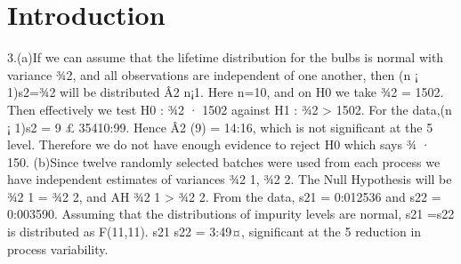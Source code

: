 \documentclass{article}
\begin{document}
\maketitle

\section{Introduction}


3.(a)If we can assume that the lifetime distribution for the bulbs is normal with variance ¾2,
and all observations are independent of one another, then (n ¡ 1)s2=¾2 will be distributed Â2
n¡1.
Here n=10, and on H0 we take ¾2 = 1502. Then effectively we test H0 : ¾2 · 1502 against
H1 : ¾2 > 1502.
For the data,(n ¡ 1)s2 = 9 £ 35410:99. Hence Â2
(9) = 14:16, which is not significant at the 5%
level. Therefore we do not have enough evidence to reject H0 which says ¾ · 150.
(b)Since twelve randomly selected batches were used from each process we have independent estimates
of variances ¾2
1, ¾2
2. The Null Hypothesis will be ¾2
1 = ¾2
2, and AH ¾2
1 > ¾2
2.
From the data, s21
= 0:012536 and s22
= 0:003590.
Assuming that the distributions of impurity levels are normal, s21
=s22
is distributed as F(11,11).
s21
s22
= 3:49¤, significant at the 5%
reduction in process variability.
\end{document}
